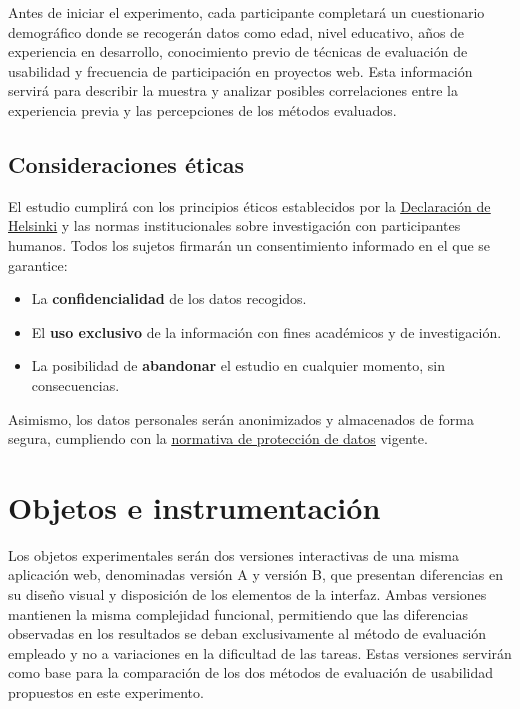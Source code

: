 \documentclass[a4paper,12pt]{report}
\begin{document}
Antes de iniciar el experimento, cada participante completará un cuestionario demográfico donde se recogerán datos como edad, nivel educativo, años de experiencia en desarrollo, conocimiento previo de técnicas de evaluación de usabilidad y frecuencia de participación en proyectos web. Esta información servirá para describir la muestra y analizar posibles correlaciones entre la experiencia previa y las percepciones de los métodos evaluados.

\subsection*{Consideraciones éticas}
El estudio cumplirá con los principios éticos establecidos por la \href{https://cnrha.sanidad.gob.es/documentacion/bioetica/pdf/Helsinki.pdf}{\uline{Declaración de Helsinki}} y las normas institucionales sobre investigación con participantes humanos. Todos los sujetos firmarán un consentimiento informado en el que se garantice:
\begin{itemize}
    \item La \textbf{confidencialidad} de los datos recogidos.
    \item El \textbf{uso exclusivo} de la información con fines académicos y de investigación.
    \item La posibilidad de \textbf{abandonar} el estudio en cualquier momento, sin consecuencias.
\end{itemize}
Asimismo, los datos personales serán anonimizados y almacenados de forma segura, cumpliendo con la \href{https://www.boe.es/buscar/act.php?id=BOE-A-2018-16673}{\uline{normativa de protección de datos}} vigente.

\section{Objetos e instrumentación}

Los objetos experimentales serán dos versiones interactivas de una misma aplicación web, denominadas versión A y versión B, que presentan diferencias en su diseño visual y 
disposición de los elementos de la interfaz. Ambas versiones mantienen la misma complejidad funcional, permitiendo que las diferencias observadas en los resultados se deban exclusivamente al método 
de evaluación empleado y no a variaciones en la dificultad de las tareas. Estas versiones servirán como base para la comparación de los dos métodos de evaluación de usabilidad propuestos en este experimento.
\end{document}
